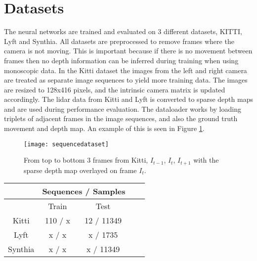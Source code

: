 \section{Datasets}

The neural networks are trained and evaluated on 3 different datasets, KITTI\cite{kitti}, Lyft\cite{lyft2019} and Synthia. All datasets are preprocessed to remove frames where the camera is not moving. This is important because if there is no movement between frames then no depth information can be inferred during training when using monoscopic data. In the Kitti dataset the images from the left and right camera are treated as separate image sequences to yield more training data. The images are resized to 128x416 pixels, and the intrinsic camera matrix is updated accordingly. The lidar data from Kitti and Lyft is converted to sparse depth maps and are used during performance evaluation. The dataloader works by loading triplets of adjacent frames in the image sequences, and also the ground truth movement and depth map. An example of this is seen in Figure \ref{fig:sequencedataset}.

\begin{figure}[H]
	\centering
	\texttt{[image: sequencedataset]}
	\caption{From top to bottom 3 frames from Kitti, $I_{t-1}$, $I_t$, $I_{t+1}$ with the sparse depth map overlayed on frame $I_t$.}
	\label{fig:sequencedataset}
\end{figure}

\begin{center}
	\begin{tabular}{ |c|c|c|c|c| } 
		\hline
		 &\multicolumn{2}{c|}{Sequences / Samples} \\ 
		 \hline
		 & Train & Test \\ 
		\hline
		Kitti & 110 / x & 12 / 11349 \\ 
		\hline
		Lyft & x / x & x / 1735 \\ 
		\hline
		Synthia & x / x & x / 11349 \\ 
		\hline
	\end{tabular}
\end{center}


